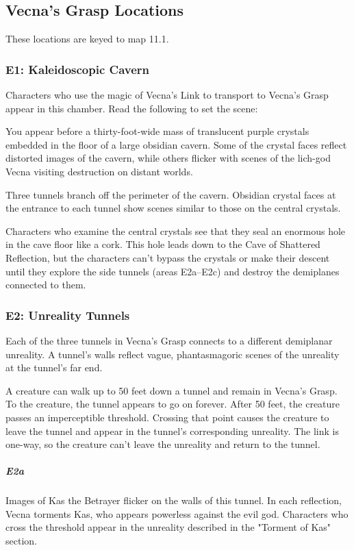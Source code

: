 \documentclass[10pt,a4paper,twoside,bg=print,twocolumn,openany,nodeprecatedcode]{dndbook}
\begin{document}
\subsection{Vecna's Grasp Locations}
These locations are keyed to map 11.1.

\subsubsection{E1: Kaleidoscopic Cavern}
Characters who use the magic of Vecna's Link to transport to Vecna's Grasp appear in this chamber. Read the following to set the scene:

\begin{DndReadAloud}{}
You appear before a thirty-foot-wide mass of translucent purple crystals embedded in the floor of a large obsidian cavern. Some of the crystal faces reflect distorted images of the cavern, while others flicker with scenes of the lich-god Vecna visiting destruction on distant worlds.

Three tunnels branch off the perimeter of the cavern. Obsidian crystal faces at the entrance to each tunnel show scenes similar to those on the central crystals.

\end{DndReadAloud}

Characters who examine the central crystals see that they seal an enormous hole in the cave floor like a cork. This hole leads down to the Cave of Shattered Reflection, but the characters can't bypass the crystals or make their descent until they explore the side tunnels (areas E2a–E2c) and destroy the demiplanes connected to them.

\subsubsection{E2: Unreality Tunnels}
Each of the three tunnels in Vecna's Grasp connects to a different demiplanar unreality. A tunnel's walls reflect vague, phantasmagoric scenes of the unreality at the tunnel's far end.

A creature can walk up to 50 feet down a tunnel and remain in Vecna's Grasp. To the creature, the tunnel appears to go on forever. After 50 feet, the creature passes an imperceptible threshold. Crossing that point causes the creature to leave the tunnel and appear in the tunnel's corresponding unreality. The link is one-way, so the creature can't leave the unreality and return to the tunnel.

\subparagraph{E2a}
Images of Kas the Betrayer flicker on the walls of this tunnel. In each reflection, Vecna torments Kas, who appears powerless against the evil god. Characters who cross the threshold appear in the unreality described in the "Torment of Kas" section.
\end{document}
